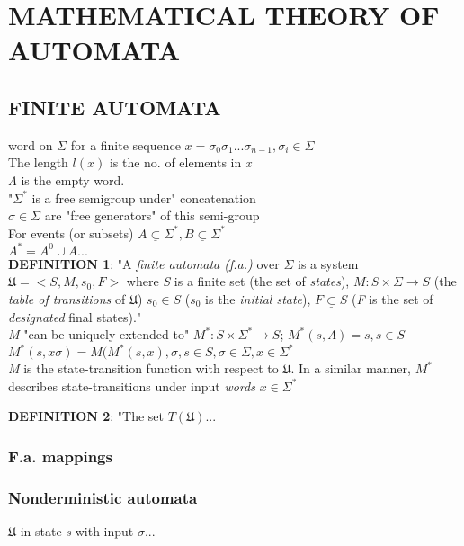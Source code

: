 
\renewcommand{\thesubsection}{\Roman{subsection}}

\section{MATHEMATICAL THEORY OF AUTOMATA}

\subsection{FINITE AUTOMATA}
word on $\Sigma$
for a finite sequence $x=\sigma_{0}\sigma_{1}...\sigma_{n-1}, \sigma_{i} \in \Sigma$\\
The length $l(x)$ is the no. of elements in \textit{x}\\
$\Lambda$ is the empty word.\\
"$\Sigma^{*}$ is a free semigroup under" concatenation\\
$\sigma \in \Sigma$ are "free generators" of this semi-group\\
For events (or subsets) $A \underline{\subset} \Sigma^{*}, B \underline{\subset} \Sigma^{*}$\\
$A^{*} = A^{0} \cup A ...$\\

\textbf{DEFINITION 1}:
"A \textit{finite automata (f.a.)} over $\Sigma$ is a system $\mathfrak{U} = < S, M, s_0, F>$ where \textit{S} is a finite set (the set of \textit{states}), $M: S \times \Sigma \to S$ (the \textit{table of transitions} of $\mathfrak{U}$) $s_0 \in S$ ($s_0$ is the \textit{initial state}), $F \underline{\subset} S$ (\textit{F} is the set of \textit{designated} final states)."\\

\textit{M} "can be uniquely extended to" $M^{*}: S \times \Sigma^{*} \to S$; $M^{*}(s, \Lambda) = s, s \in S$\\
$M^{*}(s, x\sigma) = M(M^{*}(s,x), \sigma, s \in S, \sigma \in \Sigma, x \in \Sigma^{*}$\\

\textit{M} is the state-transition function with respect to  $\mathfrak{U}$.
In a similar manner, $M^{*}$ describes state-transitions under input \textit{words} $x \in \Sigma^{*}$

\textbf{DEFINITION 2}: "The set $T(\mathfrak{U})...$

\subsubsection{F.a. mappings}

\subsubsection{Nonderministic automata}
$\mathfrak{U}$ in state \textit{s} with input $\sigma$...

